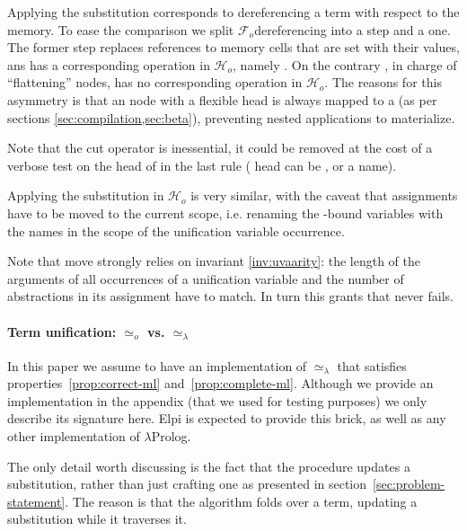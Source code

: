 \documentclass[sigconf,natbib=false,review]{acmart}
\newcommand{\UnifRel}{\ensuremath{\simeq}}
\newcommand{\Uo}{\ensuremath{\UnifRel_o}\xspace}
\newcommand{\Ue}{\ensuremath{\UnifRel_\lambda}\xspace}
\newcommand{\Fo}{\ensuremath{\mathcal{F}_{\!o}\xspace}} %
\newcommand{\Ho}{\ensuremath{\mathcal{H}_o}\xspace}
\begin{document}
Applying the substitution corresponds to dereferencing a term with respect to
the memory. To ease the comparison we split \Fo dereferencing into a
 step and a  one. The former step replaces references
to memory cells that are set with their values, ans has a corresponding
operation in \Ho, namely . On the contrary ,
in charge of ``flattening''  nodes, has no corresponding
operation in \Ho. The reasons for this asymmetry is that an 
node with a flexible head is always mapped to a  (as per
sections \ref{sec:compilation,sec:beta}), preventing nested applications to
materialize.



\noindent
Note that the cut operator is inessential, it could be
removed at the cost of a verbose test on the head of 
in the last rule ( head
can be ,  or a name).

Applying the substitution in \Ho{} is very similar, with
the caveat that assignments have to be moved to the
current scope, i.e. renaming the -bound variables
with the names in the scope of the unification variable occurrence.



\noindent
Note that move strongly relies on invariant \ref{inv:uvaarity}: the length
of the arguments of all occurrences of a unification variable and the
number of abstractions in its assignment have to match. In turn
this grants that  never fails.



\paragraph{Term unification: \Uo vs. \Ue}

In this paper we assume to have an implementation of \Ue that satisfies
properties~\ref{prop:correct-ml} and~\ref{prop:complete-ml}. Although we provide an
implementation in the appendix (that we used for testing purposes) we only
describe its signature here. Elpi is expected to provide this brick, as well as
any other implementation of $\lambda$Prolog.



\noindent
The only detail worth discussing is the fact that the procedure updates a
substitution, rather than just crafting one as presented in
section~\ref{sec:problem-statement}. The reason is that the algorithm folds
over a term, updating a substitution while it traverses it.
\end{document}
